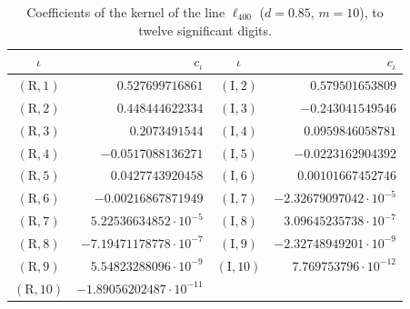 \documentclass[11pt,reqno]{amsart}
\numberwithin{equation}{section}
\theoremstyle{definition}
\theoremstyle{remark}
\begin{document}
\begin{table}[ht]\centering\small
\begin{tabular}{@{}cr@{\quad}cr@{}}\toprule $\iota$ & $c_\iota$ & $\iota$ & $c_\iota$\\\midrule
$(\mathrm R,1)$ & $0.527699716861$ & $(\mathrm I,2)$ & $0.579501653809$\\
$(\mathrm R,2)$ & $0.448444622334$ & $(\mathrm I,3)$ & $-0.243041549546$\\
$(\mathrm R,3)$ & $0.2073491544$ & $(\mathrm I,4)$ & $0.0959846058781$\\
$(\mathrm R,4)$ & $-0.0517088136271$ & $(\mathrm I,5)$ & $-0.0223162904392$\\
$(\mathrm R,5)$ & $0.0427743920458$ & $(\mathrm I,6)$ & $0.00101667452746$\\
$(\mathrm R,6)$ & $-0.00216867871949$ & $(\mathrm I,7)$ & $-2.32679097042\cdot10^{-5}$\\
$(\mathrm R,7)$ & $5.22536634852\cdot10^{-5}$ & $(\mathrm I,8)$ & $3.09645235738\cdot10^{-7}$\\
$(\mathrm R,8)$ & $-7.19471178778\cdot10^{-7}$ & $(\mathrm I,9)$ & $-2.32748949201\cdot10^{-9}$\\
$(\mathrm R,9)$ & $5.54823288096\cdot10^{-9}$ & $(\mathrm I,10)$ & $7.769753796\cdot10^{-12}$\\
$(\mathrm R,10)$ & $-1.89056202487\cdot10^{-11}$ & & \\
\bottomrule\end{tabular}
\caption{Coefficients of the kernel of the line $\ell_{400}$ ($d=0.85$, $m=10$), to twelve significant digits.}\label{tab:kernel_C400}\end{table}
\end{document}
